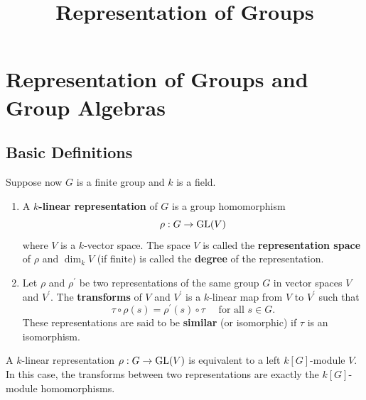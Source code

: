 \documentclass[12pt, oneside]{book}
\begin{document}
\frontmatter
\title{{\Huge{\textbf{Representation of Groups}}}}
\maketitle
{}
\tableofcontents %
\mainmatter
{} %






\chapter{Representation of Groups and Group Algebras}

\section{Basic Definitions}

\begin{definition}
    Suppose now $G$ is a finite group and $k$ is a field.
    \begin{enumerate}
        \item
              A \textbf{$k$-linear representation} of $G$
              is a group homomorphism
              \begin{equation*}
                  \rho : G \rightarrow\operatorname{\operatorname{GL}}(V)
              \end{equation*}
              where $V$ is a $k$-vector space.
              The space $V$ is called the \textbf{representation space} of $\rho$ and $\dim_k V$ (if finite) is called the \textbf{degree} of the representation.

        \item
              Let $\rho$ and $\rho^{\prime}$ be two representations of the same group $G$ in vector spaces $V$ and $V^{\prime}$.
              The \textbf{transforms} of $V$ and $V^\prime$ is a $k$-linear map from $V$ to $V^{\prime}$ such that
              \begin{equation*}
                  \tau \circ \rho(s)=\rho^{\prime}(s) \circ \tau \quad \text { for all } s \in G .
              \end{equation*}
              These representations are said to be \textbf{similar} (or isomorphic) if $\tau$ is an isomorphism.
    \end{enumerate}
    \begin{remark}
        A $k$-linear representation $\rho : G \rightarrow\operatorname{\operatorname{GL}}(V)$ is equivalent to a left $k[G]$-module $V$.
        In this case, the transforms between two representations are exactly the $k[G]$-module homomorphisms.
    \end{remark}
\end{definition}
\end{document}
